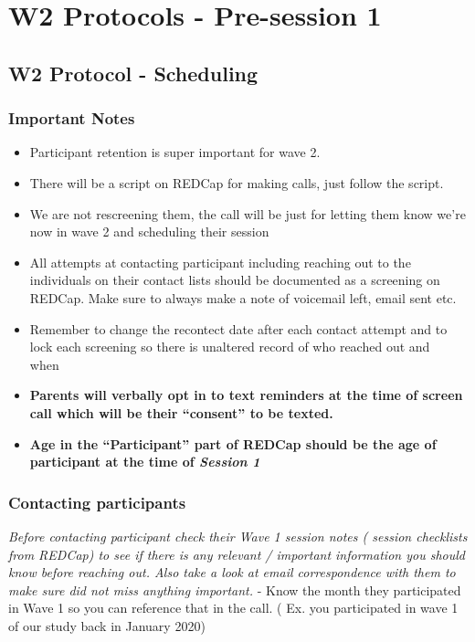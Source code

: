 \documentclass[]{book}
\providecommand{\tightlist}{%
  \setlength{\itemsep}{0pt}\setlength{\parskip}{0pt}}
\begin{document}
\hypertarget{w2-protocols---pre-session-1}{%
\section{W2 Protocols - Pre-session 1}\label{w2-protocols---pre-session-1}}

\hypertarget{w2-protocol---scheduling}{%
\subsection{W2 Protocol - Scheduling}\label{w2-protocol---scheduling}}

\hypertarget{important-notes}{%
\subsubsection{Important Notes}\label{important-notes}}

\begin{itemize}
\tightlist
\item
  Participant retention is super important for wave 2.
\item
  There will be a script on REDCap for making calls, just follow the script.
\item
  We are not rescreening them, the call will be just for letting them know we're now in wave 2 and scheduling their session
\item
  All attempts at contacting participant including reaching out to the individuals on their contact lists should be documented as a screening on REDCap. Make sure to always make a note of voicemail left, email sent etc.
\item
  Remember to change the recontect date after each contact attempt and to lock each screening so there is unaltered record of who reached out and when~
\item
  \textbf{Parents will verbally opt in to text reminders at the time of screen call which will be their ``consent'' to be texted.}
\item
  \textbf{Age in the ``Participant'' part of REDCap should be the age of participant at the time of \emph{Session 1} }
\end{itemize}

\hypertarget{contacting-participants}{%
\subsubsection{Contacting participants}\label{contacting-participants}}

\emph{Before contacting participant check their Wave 1 session notes ( session checklists from REDCap) to see if there is any relevant / important information you should know before reaching out. Also take a look at email correspondence with them to make sure did not miss anything important.}
- Know the month they participated in Wave 1 so you can reference that in the call. ( Ex. you participated in wave 1 of our study back in January 2020)~
\end{document}
